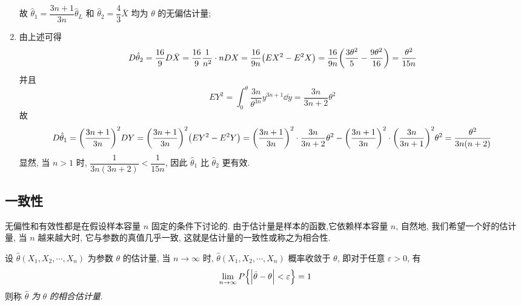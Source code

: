 \begin{solution}
\begin{enumerate}[label=(\arabic{*})]
$$        $$
        故 $\hat{\theta}_1=\dfrac{3n+1}{3n}\hat{\theta}_L$ 和 $\hat{\theta}_2=\dfrac{4}{3}\bar{X}$ 均为 $\theta$ 的无偏估计量;
        \item 由上述可得
        $$D\hat{\theta}_2=\dfrac{16}{9}D\bar{X}=\dfrac{16}{9}\dfrac{1}{n^2}\cdot nDX=\dfrac{16}{9n}\qty(EX^2-E^2X)=\dfrac{16}{9n}\qty(\dfrac{3\theta^2}{5}-\dfrac{9\theta^2}{16})=\dfrac{\theta^2}{15n}$$
        并且 $$
        EY^2=\int_{0}^{\theta} \dfrac{3n}{\theta^{3n}}y^{3n+1} \dd y=\dfrac{3n}{3n+2}\theta^2
        $$
        故
        $$
        D\hat{\theta}_1=\qty(\dfrac{3n+1}{3n})^2DY=\qty(\dfrac{3n+1}{3n})^2\qty(EY^2-E^2Y)=\qty(\dfrac{3n+1}{3n})^2\cdot\dfrac{3n}{3n+2}\theta^2-\qty(\dfrac{3n+1}{3n})^2\cdot\qty(\dfrac{3n}{3n+1})^2\theta^2=\dfrac{\theta^2}{3n(n+2)}
        $$
        显然, 当 $n>1$ 时, $\dfrac{1}{3n(3n+2)}<\dfrac{1}{15n}$, 因此 $\hat{\theta}_1$ 比 $\hat{\theta}_2$ 更有效.
    \end{enumerate}
\end{solution}

\subsection{一致性}

无偏性和有效性都是在假设样本容量 $n$ 固定的条件下讨论的.
由于估计量是样本的函数,它依赖样本容量 $n$, 自然地, 我们希望一个好的估计量, 当 $n$ 越来越大时, 它与参数的真值几乎一致, 
这就是估计量的一致性或称之为相合性.

\begin{definition}[一致性]
    设 $ \hat{\theta}\left(X_{1}, X_{2}, \cdots, X_{n}\right) $ 为参数 $ \theta $ 的估计量, 当 $ n \to \infty $ 时, $\hat{\theta}\left(X_{1}, X_{2}, \cdots, X_{n}\right) $ 概率收敛于
    $ \theta $, 即对于任意 $ \varepsilon>0 $, 有
    $$\lim _{n \to \infty} P\qty{\qty|\hat{\theta}-\theta|<\varepsilon}=1$$
    则称 $ \hat{\theta} $ \textit{为} $ \theta $ \textit{的相合估计量}.
\end{definition}

